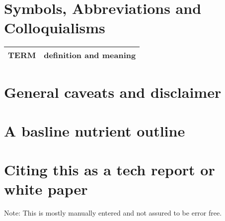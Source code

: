 \documentclass[aps,secnumarabic,balancelastpage,amsmath,amssymb,nofootinbib]{revtex4}
\begin{document}
\section{Symbols, Abbreviations and Colloquialisms}

\begin{comment}
\end{comment}


\noindent
\begin{tabular}{@{}ll}
TERM & definition and meaning   \\
\hline
\end{tabular} %


\section{General caveats and disclaimer }
\label{appendix:caveats}

%



\section{ A basline nutrient outline  }
\label{appendix:baseline}


\section{Citing this as a tech report or white paper }
\label{appendix:citing}

Note: This is mostly manually entered and not assured to be error free.
\end{document}
